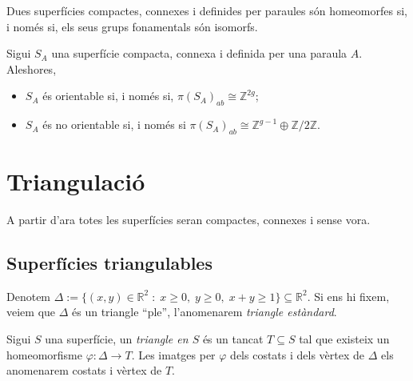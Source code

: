 \documentclass[../main.tex]{subfiles}
\begin{document}
\begin{coro}
\label{coro:orientable1} Dues superfícies compactes, connexes i definides per paraules són homeomorfes si, i només si, els seus grups fonamentals són isomorfs.
\end{coro}

\begin{coro}
\label{coro:orientable2} Sigui $S_A$ una superfície compacta, connexa i definida per una paraula $A$. Aleshores, 
\begin{itemize}
    \item $S_A$ és orientable si, i només si, $\pi(S_A)_{ab}\cong \mathbb{Z}^{2g}$;
    \item $S_A$ és no orientable si, i només si $\pi(S_A)_{ab}\cong \mathbb{Z}^{g-1}\oplus\mathbb{Z}/2\mathbb{Z}$.
\end{itemize}
\end{coro}























\section{Triangulació}

A partir d'ara totes les superfícies seran compactes, connexes i sense vora.


\subsection{Superfícies triangulables}

\begin{defi}
\label{def:triangleestandard} Denotem $\Delta := \{(x,y)\in\mathbb{R}^2\;:\;x\geq 0,\;y\geq 0,\;x+y\geq 1\}\subseteq \mathbb{R}^2$. Si ens hi fixem, veiem que $\Delta$ és un triangle ``ple'', l'anomenarem \textit{triangle estàndard}.
\end{defi}

\begin{defi}
\label{def:triangleens} Sigui $S$ una superfície, un \textit{triangle en $S$} és un tancat $T\subseteq S$ tal que existeix un homeomorfisme $\varphi:\Delta\rightarrow T$. Les imatges per $\varphi$ dels costats i dels vèrtex de $\Delta$ els anomenarem costats i vèrtex de $T$.
\end{defi}
\end{document}
